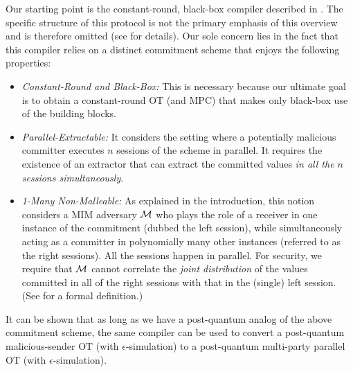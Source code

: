  Our starting point is the constant-round, black-box compiler described in \cite{FOCS:Wee10,STOC:Goyal11}. The specific structure of this protocol is not the primary emphasis of this overview and is therefore omitted (see  for details). Our sole concern lies in the fact that this compiler relies on a distinct commitment scheme that enjoys the following properties:
\begin{itemize}
\item
{\em Constant-Round and Black-Box:} This is necessary because our ultimate goal is to obtain a constant-round OT (and MPC) that makes only black-box use of the building blocks.
\item
{\em Parallel-Extractable:} It considers the setting where a potentially malicious committer executes $n$ sessions of the scheme in parallel. It requires the existence of an extractor that can extract the committed values {\em in all the $n$ sessions simultaneously}.

\item
{\em 1-Many Non-Malleable:} As explained in the introduction, this notion considers a MIM adversary $\mathcal{M}$ who plays the role of a receiver in one instance of the commitment (dubbed the left session), while simultaneously acting as a committer in polynomially many other instances (referred to as the right sessions). All the sessions happen in parallel. For security, we require that $\mathcal{M}$ cannot correlate the {\em joint distribution} of the values committed in all of the right sessions with that in the (single) left session. (See  for a formal definition.)
\end{itemize}
It can be shown that as long as we have a post-quantum analog of the above commitment scheme, the same \cite{FOCS:Wee10,STOC:Goyal11} compiler can be used to convert a post-quantum malicious-sender OT (with $\epsilon$-simulation) to a post-quantum multi-party parallel OT (with $\epsilon$-simulation). 



